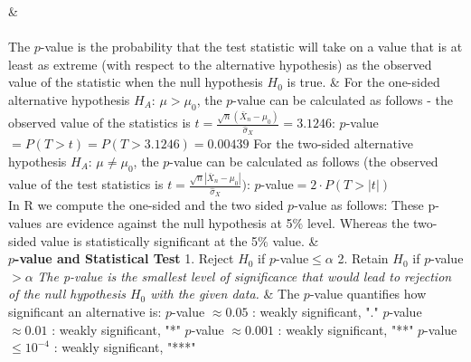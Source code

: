 {\begin{twoColTable}
		&{}\vspace*{0.1cm}{}\\ 
					\hline
		\\
		\hline
		The $p$-value is the probability that the test statistic will take on a value that is at least as extreme (with respect to the alternative hypothesis) as the observed value of the statistic when the null hypothesis $H_0$ is true.
		& For the one-sided alternative hypothesis $H_A$: $\mu > \mu_0$, the $p$-value can be calculated as follows - the observed value of the statistics is $t=\frac{\sqrt{n}(\bar{X}_n - \mu_0)}{\hat{\sigma}_{X}}=3.1246$:\vfill 
		\vspace*{0.2cm}
		$p$-value$ = P(T>t)=P(T>3.1246)=0.00439$
		\vspace*{0.2cm}
		For the two-sided alternative hypothesis $H_A$: $\mu \neq \mu_0$, the $p$-value can be calculated
		as follows (the observed value of the test statistics is $t=\frac{\sqrt{n}|\bar{X}_n - \mu_0|}{\hat{\sigma}_{X}})$:\vfill
		\vspace*{0.2cm}
		$p$-value$ = 2 \cdot P(T>|t|)$
		\\
		In {\color{blue}R} we compute the one-sided and the two sided $p$-value as follows:\vfill
		\vspace*{0.5cm}
		These p-values are evidence against the null hypothesis at 5$\%$ level. Whereas the two-sided value is statistically significant at the 5$\%$ value.
		& {}\\
		\hline
		\textbf{$p$-value and Statistical Test}\vfill
		1. Reject $H_0$ if $p$-value$ \leq \alpha$ \vfill
		2. Retain $H_0$ if $p$-value$ > \alpha$ \vfill
		\textit{The p-value is the smallest level of significance that would lead to rejection of the null hypothesis $H_0$ with the given data.}
		& The $p$-value quantifies how significant an alternative is: \vfill
		$p$-value $\approx 0.05$ : weakly significant, "."\vfill
		$p$-value $\approx 0.01$ : weakly significant, "*"\vfill
		$p$-value $\approx 0.001$ : weakly significant, "**"\vfill
		$p$-value $\leq 10^{-4}$ : weakly significant, "***"\\
		\hline
	\end{twoColTable}
	}